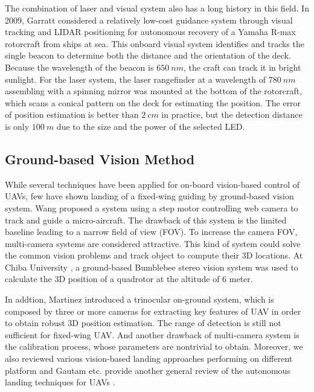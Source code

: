 
The combination of laser and visual system also has a long history in this field. In 2009, Garratt \cite{garrattvisual2009} considered a relatively low-cost guidance system through visual tracking and LIDAR positioning for autonomous recovery of a Yamaha R-max rotorcraft from ships at sea. This onboard visual system identifies and tracks the single beacon to determine both the distance and the orientation of the deck. Because the wavelength of the beacon is $650\ nm$, the craft can track it in bright sunlight. For the laser system, the laser rangefinder at a wavelength of $780\ nm$ assembling with a spinning mirror was mounted at the bottom of the rotorcraft, which scans a conical pattern on the deck for estimating the position. The error of position estimation is better than $2\ cm$ in practice, but the detection distance is only $100\ m$ due to the size and the power of the selected LED. 

\subsection{Ground-based Vision Method}
While several techniques have been applied for on-board vision-based control of UAVs, few have shown landing of a fixed-wing guiding by ground-based vision system. Wang \cite{Wang2006} proposed a system using a step motor controlling web camera to track and guide a micro-aircraft. The drawback of this system is the limited baseline leading to a narrow field of view (FOV). To increase the camera FOV, multi-camera systems are considered attractive. This kind of system could solve the common vision problems and track object to compute their 3D locations. At Chiba University \cite{pebrianti2010autonomous}, a ground-based Bumblebee stereo vision system was used to calculate the 3D position of a quadrotor at the altitude of 6 meter. 

In addtion, Martinez \cite{Martinez2009a} introduced a trinocular on-ground system, which is composed by three or more cameras for extracting key features of UAV in order to obtain robust 3D position estimation. The range of detection is still not sufficient for fixed-wing UAV. And another drawback of multi-camera system is the calibration process, whose parameters are nontrivial to obtain. Moreover, we also reviewed various vision-based landing approaches performing on different platform \cite{kong2014vision} and Gautam etc. provide another general review of the autonomous landing techniques for UAVs \cite{Gautam2014}.

